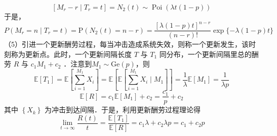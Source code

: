 \documentclass[UTF8,openany]{book}
\begin{document}
$$
\left[M_{r}-r \mid T_{r}=t\right]=N_{2}(t) \sim \operatorname{Poi}(\lambda t(1-p))
$$
于是，
$$
P\left(M_{r}=n \mid T_{r}=t\right)=\mathrm{P}\left(N_{2}(t)=n-r \right)=\frac{[\lambda(1-p) t]^{n-r}}{(n-r)!} \exp \{-\lambda(1-p) t\}
$$
（5）引进一个更新酬劳过程，每当冲击造成系统失效，则称一个更新发生，该时刻称为更新点。此时，一个更新间隔长度 $T$ 与 $T_{1}$ 同分布，一个更新间隔里总的酬劳 $R$ 与 $c_{1} M_{1}+c_{2}$ ．注意到$M_1 \sim \mathrm{Ge}(p)$，则
$$
\mathbb{E}\left[T_{1}\right]=\mathbb{E}\left[\sum_{i=1}^{M_{1}} X_{i}\right]=\mathbb{E}\left[ \mathbb{E}\left[\sum_{i=1}^{M_{1}} X_{i}\mid M_1\right]\right] =\frac{1}{\lambda}\mathbb{E}[M_1]=\frac{1}{\lambda p} 
$$
$$
\mathbb{E}[R]=c_{1} \mathbb{E}\left[M_{1}\right]+c_{2}=\frac{c_{1}}{p}+c_{2}
$$
其中 $\left\{X_{k}\right\}$ 为冲击到达间隔．于是，利用更新酬劳过程理论得
$$
\lim _{t \rightarrow \infty} \frac{R(t)}{t}=\frac{\mathbb{E}\left[T_{1}\right]}{\mathbb{E}[R]}=c_{1} \lambda+c_{2} \lambda p=c_{1}+c_{2} p
$$\\
\end{document}
